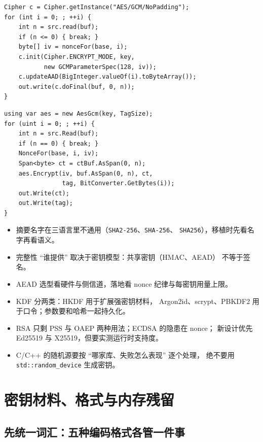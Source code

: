 \documentclass[12pt,a4paper,fontset=fandol]{ctexbook}
\newcommand{\Tp}[1]{\texttt{#1}}
\newcommand{\CppJava}{C/C++}
\begin{document}
\begin{lstlisting}[style=javastyle,caption={Java：同样的分片用 Cipher 流式接口}]
Cipher c = Cipher.getInstance("AES/GCM/NoPadding");
for (int i = 0; ; ++i) {
    int n = src.read(buf);
    if (n <= 0) { break; }
    byte[] iv = nonceFor(base, i);
    c.init(Cipher.ENCRYPT_MODE, key,
           new GCMParameterSpec(128, iv));
    c.updateAAD(BigInteger.valueOf(i).toByteArray());
    out.write(c.doFinal(buf, 0, n));
}
\end{lstlisting}

\begin{lstlisting}[style=csharpstyle,caption={C\#：AesGcm 逐片处理}]
using var aes = new AesGcm(key, TagSize);
for (uint i = 0; ; ++i) {
    int n = src.Read(buf);
    if (n == 0) { break; }
    NonceFor(base, i, iv);
    Span<byte> ct = ctBuf.AsSpan(0, n);
    aes.Encrypt(iv, buf.AsSpan(0, n), ct,
                tag, BitConverter.GetBytes(i));
    out.Write(ct);
    out.Write(tag);
}
\end{lstlisting}

\begin{guideline}[title=本章要点]
\begin{itemize}
  \item 摘要名字在三语言里不通用（\texttt{SHA2-256}、\texttt{SHA-256}、
        \Tp{SHA256}），移植时先看名字再看语义。
  \item 完整性 ``谁提供'' 取决于密钥模型：共享密钥（HMAC、AEAD）
        不等于签名。
  \item AEAD 选型看硬件与侧信道，落地看 nonce 纪律与每密钥用量上限。
  \item KDF 分两类：HKDF 用于扩展强密钥材料，
        Argon2id、scrypt、PBKDF2 用于口令；参数要和哈希一起持久化。
  \item RSA 只剩 PSS 与 OAEP 两种用法；ECDSA 的隐患在 nonce；
        新设计优先 Ed25519 与 X25519，但要实测运行时支持度。
  \item \CppJava{} 的随机源要按 ``哪家库、失败怎么表现'' 逐个处理，
        绝不要用 \Tp{std::random\_device} 生成密钥。
\end{itemize}
\end{guideline}

\chapter{密钥材料、格式与内存残留}

\section{先统一词汇：五种编码格式各管一件事}
\end{document}
